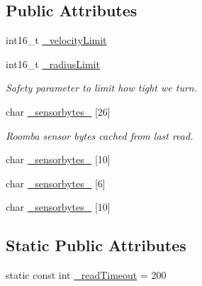 \subsection*{Public Attributes}
\begin{DoxyCompactItemize}
\item 
int16\_\-t \hyperlink{class_arduino_roomba_af5babb87f8490752103ab4ce22a5a0f5}{\_\-velocityLimit}
\item 
int16\_\-t \hyperlink{class_arduino_roomba_a218508bb243811c9b366cb8cdd2cd04b}{\_\-radiusLimit}
\begin{DoxyCompactList}\small\item\em Safety parameter to limit how tight we turn. \item\end{DoxyCompactList}\item 
char \hyperlink{class_arduino_roomba_ad0429e4cb07918eb89532605d5062b03}{\_\-sensorbytes\_} \mbox{[}26\mbox{]}
\begin{DoxyCompactList}\small\item\em Roomba sensor bytes cached from last read. \item\end{DoxyCompactList}\item 
char \hyperlink{class_arduino_roomba_a693f180d190aa31257d5bf5d1766aec1}{\_\-sensorbytes\_} \mbox{[}10\mbox{]}
\item 
char \hyperlink{class_arduino_roomba_a4ea894f4c1b9c7d976b2fdd19482ae26}{\_\-sensorbytes\_} \mbox{[}6\mbox{]}
\item 
char \hyperlink{class_arduino_roomba_a6942cabb372dfd593602d6c4762d88ec}{\_\-sensorbytes\_} \mbox{[}10\mbox{]}
\end{DoxyCompactItemize}
\subsection*{Static Public Attributes}
\begin{DoxyCompactItemize}
\item 
static const int \hyperlink{class_arduino_roomba_a8c8b81634e4b3549173cdb30db6ad70a}{\_\-readTimeout} = 200
\end{DoxyCompactItemize}
